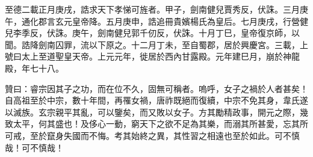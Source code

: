 \begin{pinyinscope}
 至德二載正月庚戌，誥求天下孝悌可旌者。甲子，劍南健兒賈秀反，伏誅。三月庚午，通化郡言玄元皇帝降。五月庚申，誥追冊貴嬪楊氏為皇后。七月庚戌，行營健兒李季反，伏誅。庚午，劍南健兒郭千仞反，伏誅。十月丁巳，皇帝復京師，以聞。誥降劍南囚罪，流以下原之。十二月丁未，至自蜀郡，居於興慶宮。三載，上號曰太上至道聖皇天帝。上元元年，徙居於西內甘露殿。元年建巳月，崩於神龍殿，年七十八。



 贊曰：睿宗因其子之功，而在位不久，固無可稱者。嗚呼，女子之禍於人者甚矣！自高祖至於中宗，數十年間，再罹女禍，唐祚既絕而復續，中宗不免其身，韋氏遂以滅族。玄宗親平其亂，可以鑒矣，而又敗以女子。方其勵精政事，開元之際，幾致太平，何其盛也！及侈心一動，窮天下之欲不足為其樂，而溺其所甚愛，忘其所可戒，至於竄身失國而不悔。考其始終之異，其性習之相遠也至於如此。可不慎哉！可不慎哉！



\end{pinyinscope}